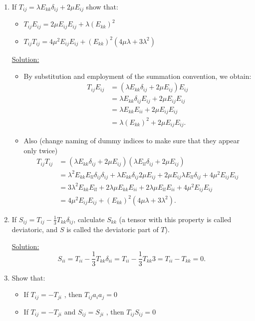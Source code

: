 \documentclass{article}
\newcommand{\ee}{\end{equation}}
\newcommand{\be}{\begin{equation}}
\newcommand{\bi}{\begin{itemize}}
\newcommand{\ei}{\end{itemize}}
\begin{document}
\begin{enumerate}
%
\item If $ T_{ij} =\lambda E_{kk}\delta_{ij}+2\mu E_{ij}$ show that:
\bi
\item $T_{ij} E_{ij}=2\mu E_{ij}E_{ij}+\lambda (E_{kk})^2$
\item $T_{ij} T_{ij}= 4\mu ^2 E_{ij} E_{ij}+ (E_{kk})^2 (4\mu \lambda+3\lambda^2)$ 
\ei
%
\underline{Solution:} \\
\bi
\item By substitution and employment of the summation convention, we obtain:
\be
\begin{array}{ll}
 T_{ij} E_{ij} &=(\lambda E_{kk}\delta_{ij}+2\mu E_{ij})E_{ij} \\
 &= \lambda E_{kk} \delta_{ij}E_{ij}+2\mu E_{ij} E_{ij} \\
 &= \lambda E_{kk} E_{ii}+ 2\mu E_{ij} E_{ij} \\
 &=\lambda(E_{kk})^2+ 2\mu E_{ij} E_{ij}.
\end{array}
\ee
\item Also (change naming of dummy indices to make sure that they appear only twice)
\be
\begin{array}{ll}
 T_{ij} T_{ij} &=(\lambda E_{kk}\delta_{ij}+2\mu E_{ij})(\lambda E_{ll}\delta_{ij}+2 \mu E_{ij}) \\
 &= \lambda^2 E_{kk} E_{ll} \delta_{ij}\delta_{ij}+\lambda E_{kk}\delta_{ij}2 \mu E_{ij}+
 2\mu E_{ij}\lambda E_{ll}\delta_{ij}+4\mu^2 E_{ij} E_{ij} \\
  &= 3 \lambda^2 E_{kk} E_{ll} + 2\lambda \mu E_{kk} E_{ii} +2\lambda \mu E_{ll} E_{ii}+ 4\mu^2 E_{ij} E_{ij}  \\
 &=4\mu ^2 E_{ij} E_{ij}+ (E_{kk})^2 (4\mu \lambda+3\lambda^2).
\end{array}
\ee
\ei

\item If $S_{ij}=T_{ij}-\frac{1}{3}T_{kk} \delta_{ij}$, calculate $S_{kk}$ (a tensor with this property is called deviatoric, and $S$ is 
called the deviatoric part of $T$).


\underline{Solution:}
\be
S_{ii}=T_{ii}-\frac{1}{3}T_{kk} \delta_{ii}=T_{ii}-\frac{1}{3}T_{kk} 3=T_{ii}-T_{kk}=0.
\ee

%
\item  Show that:
\bi
\item  If $T_{ij}=-T_{ji}$ , then $T_{ij} a_i a_j=0$
\item If $T_{ij}=-T_{ji}$  and $S_{ij} =S_{ji}$ , then $T_{ij} S_{ij}=0$
\ei


\end{enumerate}
\end{document}
